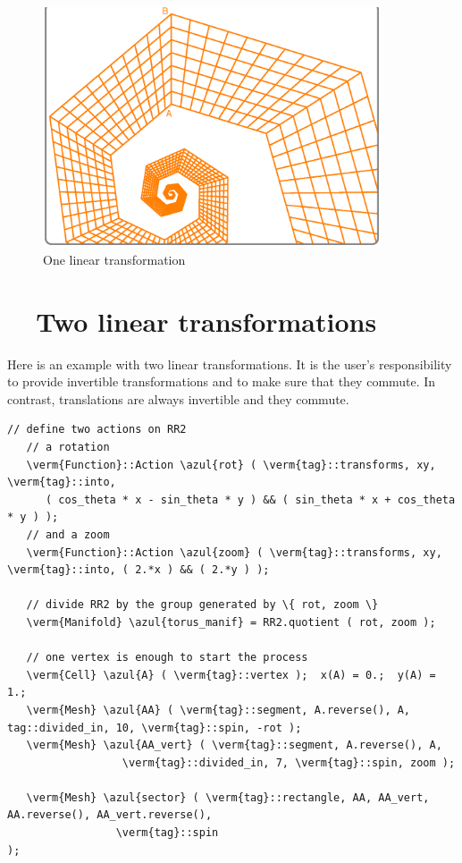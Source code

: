 \begin{figure}[ht] \centering
  \includegraphics[width=100mm]{sector-2.eps}
  \caption{One linear transformation}
  \label{\numb section 7.\numb fig 8}
\end{figure}


\section{~~Two linear transformations}\label{\numb section 7.\numb parag 13}

Here is an example with two linear transformations.
It is the user's responsibility to provide invertible transformations and
to make sure that they commute.
In contrast, translations are always invertible and they commute.

\begin{Verbatim}[commandchars=\\\{\},formatcom=\small\tt,frame=single,
   label=parag-\ref{\numb section 7.\numb parag 13}.cpp,rulecolor=\color{coment},
   baselinestretch=0.94,framesep=2mm                                             ]
   // define two actions on RR2
   // a rotation
   \verm{Function}::Action \azul{rot} ( \verm{tag}::transforms, xy, \verm{tag}::into,
      ( cos_theta * x - sin_theta * y ) && ( sin_theta * x + cos_theta * y ) );
   // and a zoom
   \verm{Function}::Action \azul{zoom} ( \verm{tag}::transforms, xy, \verm{tag}::into, ( 2.*x ) && ( 2.*y ) );

   // divide RR2 by the group generated by \{ rot, zoom \}
   \verm{Manifold} \azul{torus_manif} = RR2.quotient ( rot, zoom );

   // one vertex is enough to start the process
   \verm{Cell} \azul{A} ( \verm{tag}::vertex );  x(A) = 0.;  y(A) = 1.;
   \verm{Mesh} \azul{AA} ( \verm{tag}::segment, A.reverse(), A, tag::divided_in, 10, \verm{tag}::spin, -rot );
   \verm{Mesh} \azul{AA_vert} ( \verm{tag}::segment, A.reverse(), A,
                  \verm{tag}::divided_in, 7, \verm{tag}::spin, zoom );

   \verm{Mesh} \azul{sector} ( \verm{tag}::rectangle, AA, AA_vert, AA.reverse(), AA_vert.reverse(),
                 \verm{tag}::spin                                                    );
\end{Verbatim}
  
